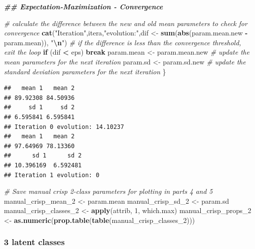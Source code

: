 \documentclass[
]{article}
\newenvironment{Shaded}{\begin{snugshade}}{\end{snugshade}}
\newcommand{\CommentTok}[1]{\textcolor[rgb]{0.56,0.35,0.01}{\textit{#1}}}
\newcommand{\ControlFlowTok}[1]{\textcolor[rgb]{0.13,0.29,0.53}{\textbf{#1}}}
\newcommand{\DecValTok}[1]{\textcolor[rgb]{0.00,0.00,0.81}{#1}}
\newcommand{\DocumentationTok}[1]{\textcolor[rgb]{0.56,0.35,0.01}{\textbf{\textit{#1}}}}
\newcommand{\FunctionTok}[1]{\textcolor[rgb]{0.13,0.29,0.53}{\textbf{#1}}}
\newcommand{\NormalTok}[1]{#1}
\newcommand{\OtherTok}[1]{\textcolor[rgb]{0.56,0.35,0.01}{#1}}
\newcommand{\SpecialCharTok}[1]{\textcolor[rgb]{0.81,0.36,0.00}{\textbf{#1}}}
\newcommand{\StringTok}[1]{\textcolor[rgb]{0.31,0.60,0.02}{#1}}
\begin{document}
\begin{Shaded}
\begin{Highlighting}[]
  \DocumentationTok{\#\# Expectation{-}Maximization {-} Convergence}

  \CommentTok{\# calculate the difference between the new and old mean parameters to check for convergence}
  \FunctionTok{cat}\NormalTok{(}\StringTok{"Iteration"}\NormalTok{,itera,}\StringTok{"evolution:"}\NormalTok{,dif }\OtherTok{\textless{}{-}} \FunctionTok{sum}\NormalTok{(}\FunctionTok{abs}\NormalTok{(param.mean.new }\SpecialCharTok{{-}}\NormalTok{ param.mean)), }\StringTok{"}\SpecialCharTok{\textbackslash{}n}\StringTok{"}\NormalTok{)}
  \CommentTok{\# if the difference is less than the convergence threshold, exit the loop }
  \ControlFlowTok{if}\NormalTok{ (dif }\SpecialCharTok{\textless{}}\NormalTok{ eps) }\ControlFlowTok{break} 
\NormalTok{  param.mean }\OtherTok{\textless{}{-}}\NormalTok{ param.mean.new }\CommentTok{\# update the mean parameters for the next iteration}
\NormalTok{  param.sd }\OtherTok{\textless{}{-}}\NormalTok{ param.sd.new }\CommentTok{\# update the standard deviation parameters for the next iteration}
\NormalTok{\}}
\end{Highlighting}
\end{Shaded}

\begin{verbatim}
##   mean 1   mean 2 
## 89.92308 84.50936 
##     sd 1     sd 2 
## 6.595841 6.595841 
## Iteration 0 evolution: 14.10237 
##   mean 1   mean 2 
## 97.64969 78.13360 
##      sd 1      sd 2 
## 10.396169  6.592481 
## Iteration 1 evolution: 0
\end{verbatim}

\begin{Shaded}
\begin{Highlighting}[]
\CommentTok{\# Save manual crisp 2{-}class parameters for plotting in parts 4 and 5}
\NormalTok{manual\_crisp\_mean\_2 }\OtherTok{\textless{}{-}}\NormalTok{ param.mean}
\NormalTok{manual\_crisp\_sd\_2 }\OtherTok{\textless{}{-}}\NormalTok{ param.sd}
\NormalTok{manual\_crisp\_classes\_2 }\OtherTok{\textless{}{-}} \FunctionTok{apply}\NormalTok{(attrib, }\DecValTok{1}\NormalTok{, which.max)}
\NormalTok{manual\_crisp\_props\_2 }\OtherTok{\textless{}{-}} \FunctionTok{as.numeric}\NormalTok{(}\FunctionTok{prop.table}\NormalTok{(}\FunctionTok{table}\NormalTok{(manual\_crisp\_classes\_2)))}
\end{Highlighting}
\end{Shaded}

\subsubsection{3 latent classes}\label{latent-classes-3}
\end{document}
